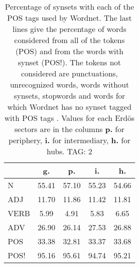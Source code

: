 \begin{table}[h!]
\begin{center}
\begin{tabular}{| l || c | c | c | c |}\hline
 & {\bf g.} & {\bf p.} & {\bf i.} & {\bf h.} \\\hline\hline
N & 55.41  & 57.10  & 55.23  & 54.66 \\\hline
ADJ & 11.70  & 11.86  & 11.42  & 11.81 \\\hline
VERB & 5.99  & 4.91  & 5.83  & 6.65 \\\hline
ADV & 26.90  & 26.14  & 27.53  & 26.88 \\\hline\hline
POS & 33.38  & 32.81  & 33.37  & 33.68 \\\hline
POS! & 95.16  & 95.61  & 94.74  & 95.21 \\\hline
\end{tabular}
\caption{Percentage of synsets with each of the POS tags used by Wordnet. The last lines give the percentage of words considered from all of the tokens (POS) and from the words with synset (POS!). The tokens not considered are punctuations, unrecognized words, words without synsets, stopwords and words for which Wordnet has no synset  tagged with POS tags . Values for each Erd\"os sectors are in the columns {{\bf p.}} for periphery, {{\bf i.}} for intermediary, {{\bf h.}} for hubs. TAG: 2}
\end{center}
\end{table}